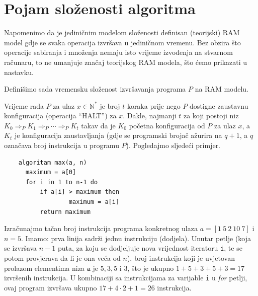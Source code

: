 \section{Pojam složenosti algoritma}

Napomenimo da je jediničnim modelom složenosti definisan (teorijski) RAM model gdje se svaka operacija izvršava u jediničnom vremenu.  Bez obzira što operacije sabiranja i množenja nemaju isto vrijeme izvođenja na stvarnom računaru, to ne umanjuje značaj teorijskog RAM modela, što ćemo prikazati u nastavku.   

Definišimo sada vremensku složenost izvršavanja programa $P$ na RAM modelu.

\begin{definition}
	Vrijeme rada $P$ za ulaz  $x \in \mathbb{N}^*$ je broj $t$ koraka prije nego $P$ dostigne zaustavnu
	konfiguracija (operacija ``HALT'') za $x$. Dakle, najmanji $t$ za koji postoji niz $K_0 \Rightarrow_P  K_1 \Rightarrow_P \cdots \Rightarrow_P K_t$ takav da je $K_0$
	početna konfiguracija od $P$ za ulaz $x$, a $K_t$ je konfiguracija zaustavljanja (gdje se programski brojač  ažurira na $q + 1$, a $q$
	označava broj instrukcija u programu $P$).  
	Pogledajmo sljedeći primjer. 
	
\end{definition}
 
	
\begin{verbatim}
	algoritam max(a, n)
	  maximum = a[0]
 	  for i in 1 to n-1 do
	      if a[i] > maximum then
                  maximum = a[i]
          return maximum    
\end{verbatim}


Izračunajmo tačan broj instrukcija programa konkretnog ulaza $a = [1\ 5\ 2\ 10\ 7]$ i $n = 5$. Imamo: prva linija sadrži jednu instrukciju (dodjela). Unutar petlje (koja se izvršava $n-1$ puta, za koju se dodjeljuje nova  vrijednost iteratoru \texttt{i}, te se potom provjerava da li je ona veća od $n$), broj instrukcija koji je uvjetovan prolazom elementima niza  $\texttt{a}$ je $5, 3, 5$ i $3$, što je ukupno $1+5+3+5+3=17$ izvršenih instrukcija.  U kombinaciji sa instrukcijama za varijable \texttt{i} u \emph{for} petlji, ovaj program izvršava ukupno $17+ 4 \cdot 2 + 1 = 26$ instrukcija.



